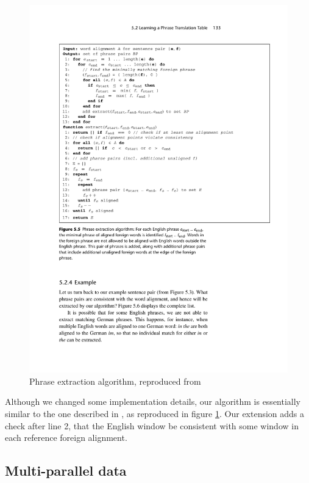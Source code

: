 \documentclass[11pt]{article}
\begin{document}
\begin{figure}[t]
\includegraphics[width=\textwidth]{koehnExtractionAlgorithm}
\caption{Phrase extraction algorithm, reproduced from \protect\cite{Koehn:2010}}
\label{f:algorithm}
\end{figure}

Although we changed some implementation details, our algorithm is essentially similar to the one described in \cite[page 133]{Koehn:2010}, as reproduced in figure \ref{f:algorithm}. Our extension adds a check after line 2, that the English window be consistent with some window in each reference foreign alignment.



\subsection{Multi-parallel data}
\end{document}
